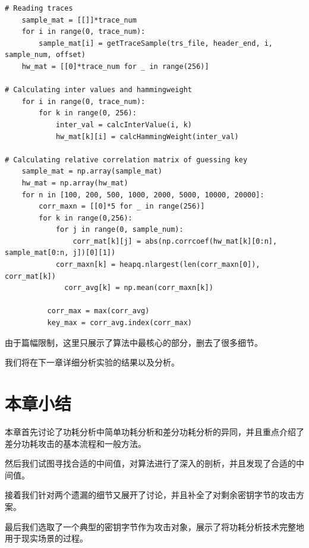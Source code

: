 \begin{lstlisting}[style=myPython,label={lst:whole_attack},caption={功耗分析攻击的完整流程}]
# Reading traces
    sample_mat = [[]]*trace_num
    for i in range(0, trace_num):
        sample_mat[i] = getTraceSample(trs_file, header_end, i, sample_num, offset)
    hw_mat = [[0]*trace_num for _ in range(256)]

# Calculating inter values and hammingweight
    for i in range(0, trace_num):
        for k in range(0, 256):
            inter_val = calcInterValue(i, k)
            hw_mat[k][i] = calcHammingWeight(inter_val)

# Calculating relative correlation matrix of guessing key
    sample_mat = np.array(sample_mat)
    hw_mat = np.array(hw_mat)
    for n in [100, 200, 500, 1000, 2000, 5000, 10000, 20000]:
        corr_maxn = [[0]*5 for _ in range(256)]
        for k in range(0,256):
            for j in range(0, sample_num):
                corr_mat[k][j] = abs(np.corrcoef(hw_mat[k][0:n], sample_mat[0:n, j])[0][1])
            corr_maxn[k] = heapq.nlargest(len(corr_maxn[0]), corr_mat[k])
              corr_avg[k] = np.mean(corr_maxn[k])
  
          corr_max = max(corr_avg)
          key_max = corr_avg.index(corr_max)
\end{lstlisting}

由于篇幅限制，这里只展示了算法中最核心的部分，删去了很多细节。

我们将在下一章详细分析实验的结果以及分析。


\section{本章小结}


本章首先讨论了功耗分析中简单功耗分析和差分功耗分析的异同，并且重点介绍了差分功耗攻击的基本流程和一般方法。

然后我们试图寻找合适的中间值，对算法进行了深入的剖析，并且发现了合适的中间值。

接着我们针对两个遗漏的细节又展开了讨论，并且补全了对剩余密钥字节的攻击方案。

最后我们选取了一个典型的密钥字节作为攻击对象，展示了将功耗分析技术完整地用于现实场景的过程。
